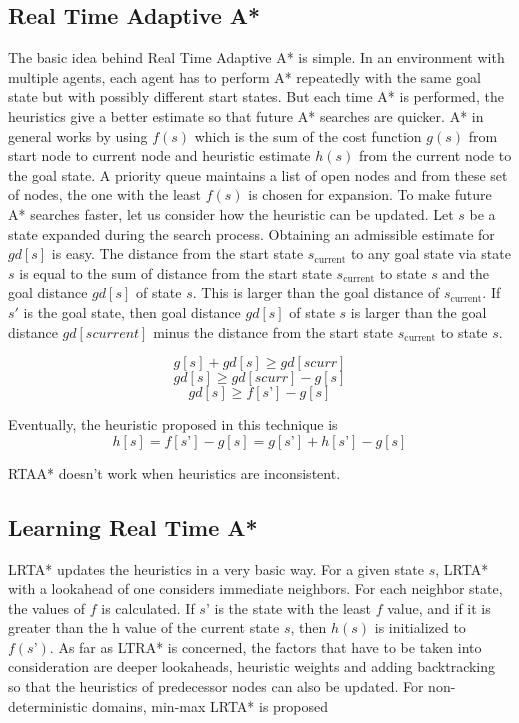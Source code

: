 \documentclass[tog]{acmsiggraph}
\begin{document}
\subsection{Real Time Adaptive A*}

The basic idea behind Real Time Adaptive A* is simple. In an
environment with multiple agents, each agent has to perform A*
repeatedly with the same goal state but with possibly different start
states. But each time A* is performed, the heuristics give a better
estimate so that future A* searches are quicker. A* in general works
by using \(f(s)\) which is the sum of the cost function \(g(s)\) from
start node to current node and heuristic estimate \(h(s)\) from the
current node to the goal state. A priority queue maintains a list of
open nodes and from these set of nodes, the one with the least
\(f(s)\) is chosen for expansion. To make future A* searches faster,
let us consider how the heuristic can be updated. Let \(s\) be a state
expanded during the search process. Obtaining an admissible estimate
for \(gd[s]\) is easy. The distance from the start state
\(s_\text{current}\) to any goal state via state \(s\) is equal to the
sum of distance from the start state \(s_\text{current}\) to state
\(s\) and the goal distance \(gd[s]\) of state \(s\). This is larger
than the goal distance of \(s_\text{current}\). If \(s'\) is the goal
state, then goal distance \(gd[s]\) of state \(s\) is larger than the
goal distance \(gd[scurrent]\) minus the distance from the start state
\(s_\text{current}\) to state \(s\).

\[ g[s] + gd[s] ≥ gd[scurr] \]
\[ gd[s] ≥ gd[scurr] − g[s] \]
\[ gd[s] ≥ f[s’] − g[s] \]

Eventually, the heuristic proposed in this technique is
\[ h[s] = f[s’] − g[s] = g[s’] + h[s’] − g[s] \]


RTAA* doesn’t work when heuristics are inconsistent.  

\subsection{Learning Real Time A*}

LRTA* updates the heuristics in a very basic way. For a given state
\(s\), LRTA* with a lookahead of one considers immediate neighbors.
For each neighbor state, the values of \(f\) is calculated. If \(s’\)
is the state with the least \(f\) value, and if it is greater than the
h value of the current state \(s\), then \(h(s)\) is initialized to
\(f(s’)\). As far as LTRA* is concerned, the factors that have to be
taken into consideration are deeper lookaheads, heuristic weights and
adding backtracking so that the heuristics of predecessor nodes can
also be updated. For non-deterministic domains, min-max LRTA* is
proposed

\end{document}
